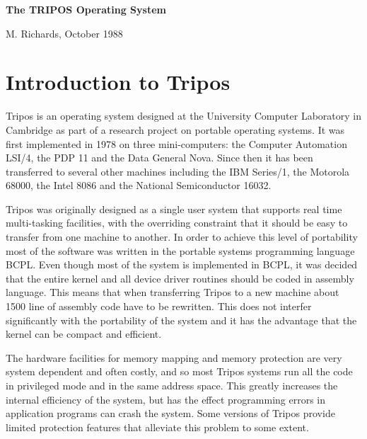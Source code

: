 %


\pagestyle{plain}



\parindent=22pt
\addtolength{\parskip}{0.2cm}
\sloppy

\bigskip

\centerline{\bf \Large The TRIPOS Operating System}
\medskip

\centerline{M. Richards, October 1988}
\bigskip




\section{Introduction to Tripos}

Tripos is an operating system designed at the University Computer
Laboratory in Cambridge as part of a research project on portable
operating systems.  It was first implemented in 1978 on three
mini-computers: the Computer Automation LSI/4, the PDP 11 and the Data
General Nova.  Since then it has been transferred to several other
machines including the IBM Series/1, the Motorola 68000, the Intel
8086 and the National Semiconductor 16032.

Tripos was originally designed as a single user system that supports
real time multi-tasking facilities, with the overriding constraint
that it should be easy to transfer from one machine to another.  In
order to achieve this level of portability most of the software was
written in the portable systems programming language BCPL.  Even
though most of the system is implemented in BCPL, it was decided that
the entire kernel and all device driver routines should be coded in
assembly language.  This means that when transferring Tripos to a new
machine about 1500 line of assembly code have to be rewritten.  This
does not interfer significantly with the portability of the system and
it has the advantage that the kernel can be compact and efficient.

The hardware facilities for memory mapping and memory protection are
very system dependent and often costly, and so most Tripos systems run
all the code in privileged mode and in the same address space.  This
greatly increases the internal efficiency of the system, but has the
effect programming errors in application programs can crash the
system.  Some versions of Tripos provide limited protection features
that alleviate this problem to some extent.

